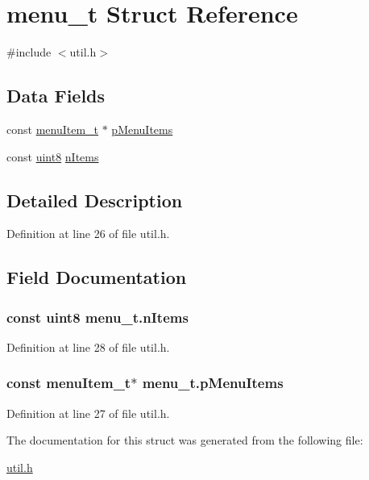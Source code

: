 \hypertarget{structmenu__t}{
\section{menu\_\-t Struct Reference}
\label{structmenu__t}
}


{\ttfamily \#include $<$util.h$>$}

\subsection*{Data Fields}
\begin{DoxyCompactItemize}
\item 
const \hyperlink{structmenu_item__t}{menuItem\_\-t} $\ast$ \hyperlink{structmenu__t_a4951db859bf4154df2a8bbd949d69092}{pMenuItems}
\item 
const \hyperlink{hal__types_8h_adde6aaee8457bee49c2a92621fe22b79}{uint8} \hyperlink{structmenu__t_ae4c267a6e8bccb1df81cafa853872c35}{nItems}
\end{DoxyCompactItemize}


\subsection{Detailed Description}


Definition at line 26 of file util.h.



\subsection{Field Documentation}
\hypertarget{structmenu__t_ae4c267a6e8bccb1df81cafa853872c35}{
\subsubsection[{nItems}]{\setlength{\rightskip}{0pt plus 5cm}const {\bf uint8} {\bf menu\_\-t.nItems}}}
\label{structmenu__t_ae4c267a6e8bccb1df81cafa853872c35}


Definition at line 28 of file util.h.

\hypertarget{structmenu__t_a4951db859bf4154df2a8bbd949d69092}{
\subsubsection[{pMenuItems}]{\setlength{\rightskip}{0pt plus 5cm}const {\bf menuItem\_\-t}$\ast$ {\bf menu\_\-t.pMenuItems}}}
\label{structmenu__t_a4951db859bf4154df2a8bbd949d69092}


Definition at line 27 of file util.h.



The documentation for this struct was generated from the following file:\begin{DoxyCompactItemize}
\item 
\hyperlink{util_8h}{util.h}\end{DoxyCompactItemize}
